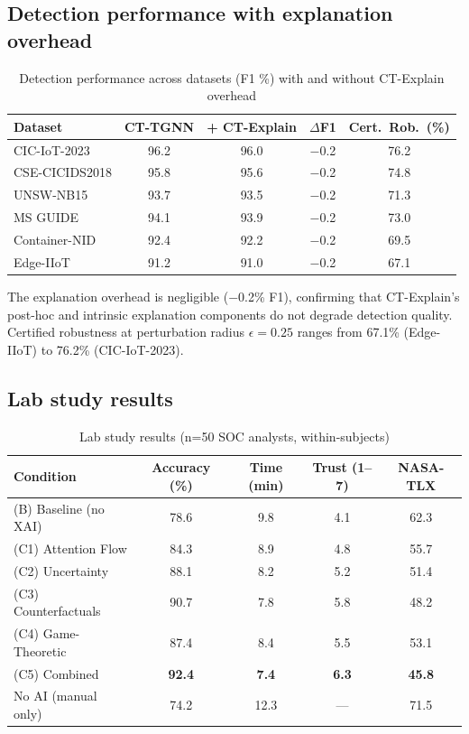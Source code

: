 \documentclass[preprint,review,12pt]{elsarticle}
\begin{document}
\subsection{Detection performance with explanation overhead}

\begin{table}[!t]
\centering
\caption{Detection performance across datasets (F1 \%) with and without CT-Explain overhead}
\label{tab:detection_performance}
\begin{tabular}{@{}lcccc@{}}
\toprule
\textbf{Dataset} & \textbf{CT-TGNN} & \textbf{+ CT-Explain} & \textbf{$\Delta$F1} & \textbf{Cert.\ Rob.\ (\%)} \\
\midrule
CIC-IoT-2023 & 96.2 & 96.0 & $-$0.2 & 76.2 \\
CSE-CICIDS2018 & 95.8 & 95.6 & $-$0.2 & 74.8 \\
UNSW-NB15 & 93.7 & 93.5 & $-$0.2 & 71.3 \\
MS GUIDE & 94.1 & 93.9 & $-$0.2 & 73.0 \\
Container-NID & 92.4 & 92.2 & $-$0.2 & 69.5 \\
Edge-IIoT & 91.2 & 91.0 & $-$0.2 & 67.1 \\
\bottomrule
\end{tabular}
\end{table}

The explanation overhead is negligible ($-$0.2\% F1), confirming that CT-Explain's post-hoc and intrinsic explanation components do not degrade detection quality. Certified robustness at perturbation radius $\epsilon=0.25$ ranges from 67.1\% (Edge-IIoT) to 76.2\% (CIC-IoT-2023).

\subsection{Lab study results}

\begin{table}[!t]
\centering
\caption{Lab study results (n=50 SOC analysts, within-subjects)}
\label{tab:lab_study}
\begin{tabular}{@{}lcccc@{}}
\toprule
\textbf{Condition} & \textbf{Accuracy (\%)} & \textbf{Time (min)} & \textbf{Trust (1--7)} & \textbf{NASA-TLX} \\
\midrule
(B) Baseline (no XAI) & 78.6 & 9.8 & 4.1 & 62.3 \\
(C1) Attention Flow & 84.3 & 8.9 & 4.8 & 55.7 \\
(C2) Uncertainty & 88.1 & 8.2 & 5.2 & 51.4 \\
(C3) Counterfactuals & 90.7 & 7.8 & 5.8 & 48.2 \\
(C4) Game-Theoretic & 87.4 & 8.4 & 5.5 & 53.1 \\
(C5) Combined & \textbf{92.4} & \textbf{7.4} & \textbf{6.3} & \textbf{45.8} \\
\midrule
No AI (manual only) & 74.2 & 12.3 & --- & 71.5 \\
\bottomrule
\end{tabular}
\end{table}
\end{document}
